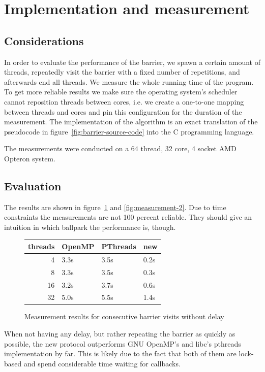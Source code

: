 \documentclass[a4paper, 10pt]{article}
\begin{document}
\clearpage

\section{Implementation and measurement}
\subsection{Considerations}
In order to evaluate the performance of the barrier, we spawn a certain amount of threads, repeatedly visit the barrier with a fixed number of repetitions, and afterwards end all threads. We measure the whole running time of the program. To get more reliable results we make sure the operating system's scheduler cannot reposition threads between cores, i.e. we create a one-to-one mapping between threads and cores and pin this configuration for the duration of the measurement. The implementation of the algorithm is an exact translation of the pseudocode in figure~\ref{fig:barrier-source-code} into the C programming language.

The measurements were conducted on a 64 thread, 32 core, 4 socket AMD Opteron system.
\subsection{Evaluation}
The results are shown in figure~\ref{fig:measurement-1} and \ref{fig:measurement-2}. Due to time constraints the measurements are not 100 percent reliable. They should give an intuition in which ballpark the performance is, though.
\begin{figure}[htbp]
	\centering
	\begin{tabular}{r | l l l }
		threads & OpenMP  & PThreads  & new \\
		\hline
		 4      & 3.3s    & 3.5s      & 0.2s \\
		 8      & 3.3s    & 3.5s      & 0.3s \\
		16      & 3.2s    & 3.7s      & 0.6s \\
		32      & 5.0s    & 5.5s      & 1.4s \\
	\end{tabular}
	\caption{Measurement results for consecutive barrier visits without delay}
	\label{fig:measurement-1}
\end{figure}

When not having any delay, but rather repeating the barrier as quickly as possible, the new protocol outperforms GNU OpenMP's and libc's pthreads implementation by far. This is likely due to the fact that both of them are lock-based and spend considerable time waiting for callbacks.
\end{document}
